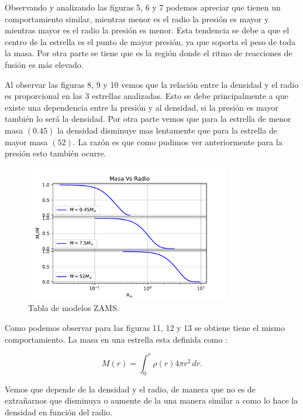 \documentclass[12pt]{article}
\begin{document}
Observando y analizando las figuras 5, 6 y 7 podemos apreciar que tienen un comportamiento similar, mientras menor es el radio la presión es mayor y mientras mayor es el radio la presión es menor. Esta tendencia se debe a que el centro de la estrella es el punto de mayor presión, ya que soporta el peso de toda la masa. Por otra parte se tiene que es la región donde el ritmo de reacciones de fusión es más elevado.





Al observar las figuras 8, 9 y 10 vemos que la relación entre la densidad y el radio es proporcional en las 3 estrellas analizadas. Esto se debe principalmente a que existe una dependencia entre la presión y al densidad, si la presión es mayor también lo será la densidad.
Por otra parte vemos que para la estrella de menor masa $(0.45)$ la densidad disminuye mas lentamente que para la estrella de mayor masa $(52)$. La razón es que como pudimos ver anteriormente para la presión esto también ocurre.  

\begin{figure}[H]
    \centering   
    \includegraphics[width=0.8\textwidth]{Masa_graficas.pdf}
    \caption{Tabla de modelos ZAMS.}
    \label{fig:zams}
\end{figure}


Como podemos observar para las figuras 11, 12 y 13 se obtiene tiene el mismo comportamiento. La masa en una estrella esta definida como :

\begin{equation}
M(r)=\int_{0}^{r}  \! \rho (r) 4\pi r^2 \, dr .
\end{equation}

Vemos que depende de la densidad y el radio, de manera que no es de extrañarnos que disminuya o aumente de la una manera similar a como lo hace la densidad en función del radio. \cite{AE}  
\end{document}
